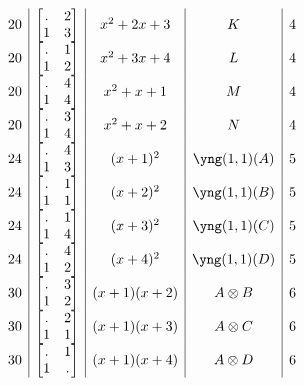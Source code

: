 \documentclass[11pt,oneside]{article}
\newcommand{\tensor}{\otimes}
\begin{document}
$$\begin{array}{c|c|c|c|r}
20  &  \begin{bmatrix}.&2\\1&3\end{bmatrix}   & x^2+2x+3  & K & 4  \\
20  &  \begin{bmatrix}.&1\\1&2\end{bmatrix}   & x^2+3x+4  & L & 4  \\
20  &  \begin{bmatrix}.&4\\1&4\end{bmatrix}   & x^2+x+1   & M & 4  \\
20  &  \begin{bmatrix}.&3\\1&4\end{bmatrix}   & x^2+x+2   & N & 4  \\
24  &  \begin{bmatrix}.&4\\1&3\end{bmatrix}   & (x+1)^2   & \yng(1,1)(A) & 5  \\
24  &  \begin{bmatrix}.&1\\1&1\end{bmatrix}   & (x+2)^2   & \yng(1,1)(B) & 5  \\
24  &  \begin{bmatrix}.&1\\1&4\end{bmatrix}   & (x+3)^2   & \yng(1,1)(C) & 5  \\
24  &  \begin{bmatrix}.&4\\1&2\end{bmatrix}   & (x+4)^2   & \yng(1,1)(D) & 5  \\
30  &  \begin{bmatrix}.&3\\1&2\end{bmatrix}   & (x+1)(x+2)  & A\tensor B & 6  \\
30  &  \begin{bmatrix}.&2\\1&1\end{bmatrix}   & (x+1)(x+3)  & A\tensor C & 6  \\
30  &  \begin{bmatrix}.&1\\1&.\end{bmatrix}   & (x+1)(x+4)  & A\tensor D & 6  \\

\end{array}$$
\end{document}
